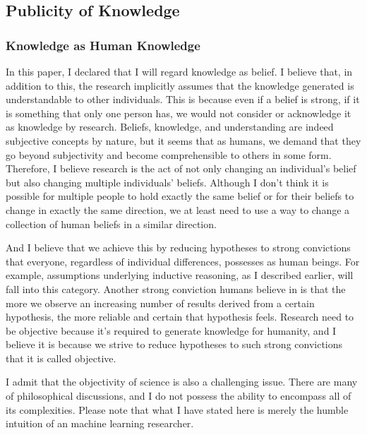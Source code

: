 \documentclass{book}
\begin{document}
\subsection{Publicity of Knowledge}
\subsubsection{Knowledge as Human Knowledge}
In this paper, I declared that I will regard knowledge as belief. I believe that, in addition to this, the research implicitly assumes that the knowledge generated is understandable to other individuals. This is because even if a belief is strong, if it is something that only one person has, we would not consider or acknowledge it as knowledge by research. Beliefs, knowledge, and understanding are indeed subjective concepts by nature, but it seems that as humans, we demand that they go beyond subjectivity and become comprehensible to others in some form. Therefore, I believe research is the act of not only changing an individual's belief but also changing multiple individuals' beliefs. Although I don't think it is possible for multiple people to hold exactly the same belief or for their beliefs to change in exactly the same direction, we at least need to use a way to change a collection of human beliefs in a similar direction.

And I believe that we achieve this by reducing hypotheses to strong convictions that everyone, regardless of individual differences, possesses as human beings. For example, assumptions underlying inductive reasoning, as I described earlier, will fall into this category. Another strong conviction humans believe in is that the more we observe an increasing number of results derived from a certain hypothesis, the more reliable and certain that hypothesis feels. Research need to be objective because it's required to generate knowledge for humanity, and I believe it is because we strive to reduce hypotheses to such strong convictions that it is called objective. 

I admit that the objectivity of science is also a challenging issue. There are many of philosophical discussions, and I do not possess the ability to encompass all of its complexities. Please note that what I have stated here is merely the humble intuition of an machine learning researcher.
\end{document}
